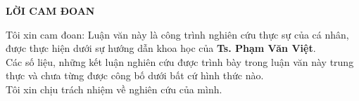 \newpage
\begin{center}
	\textbf{LỜI CAM ĐOAN}
\end{center}


Tôi xin cam đoan: Luận văn này là công trình nghiên cứu thực sự của cá nhân, được thực hiện dưới sự hướng dẫn khoa học của \textbf{Ts. Phạm Văn Việt}. \\

Các số liệu, những kết luận nghiên cứu được trình bày trong luận văn này trung thực và chưa từng được công bố dưới bất cứ hình thức nào.\\

Tôi xin chịu trách nhiệm về nghiên cứu của mình.



